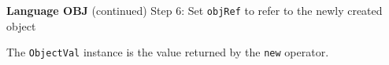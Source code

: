 \begin{minipage}[t]{\sw}
\slidenumber
\LARGE
{\bf Language OBJ} (continued)\exx
Step 6: Set \verb'objRef' to refer to the newly created object\exx
\centerline{}
The \verb'ObjectVal' instance is the value returned
by the \verb'new' operator.
\end{minipage}
